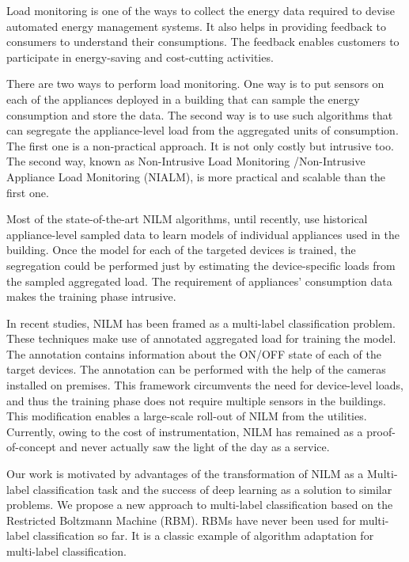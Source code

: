 \documentclass{article}
\begin{document}
Load monitoring is one of the ways to collect the energy data required to devise automated energy management systems.  It also helps in providing feedback to consumers to understand their consumptions. The feedback enables customers to participate in energy-saving and cost-cutting activities\cite{darby2006effectiveness}.

There are two ways to perform load monitoring. One way is to put sensors on each of the appliances deployed in a building that can sample the energy consumption and store the data. The second way is to use such algorithms that can segregate the appliance-level load from the aggregated units of consumption. The first one is a non-practical approach. It is not only costly but intrusive too. The second way, known as Non-Intrusive Load Monitoring /Non-Intrusive Appliance Load Monitoring (NIALM), is more practical and scalable than the first one.

Most of the state-of-the-art NILM algorithms, until recently, use historical appliance-level sampled data to learn models of individual appliances used in the building. Once the model for each of the targeted devices is trained, the segregation could be performed just by estimating the device-specific loads from the sampled aggregated load. The requirement of appliances' consumption data makes the training phase intrusive.

In recent studies, NILM has been framed as a multi-label classification problem.  These techniques make use of annotated aggregated load for training the model.  The annotation contains information about the ON/OFF state of each of the target devices. The annotation can be performed with the help of the cameras installed on premises. This framework circumvents the need for device-level loads, and thus the training phase does not require multiple sensors in the buildings. This modification enables a large-scale roll-out of NILM from the utilities. Currently, owing to the cost of instrumentation, NILM has remained as a proof-of-concept and never actually saw the light of the day as a service.

Our work is motivated by advantages of the transformation of NILM as a Multi-label classification task and the success of deep learning as a solution to similar problems. We propose a new approach to multi-label classification based on the Restricted Boltzmann Machine (RBM)\cite{Larochelle2008CUD}. RBMs have never been used for multi-label classification so far. It is a classic example of algorithm adaptation for multi-label classification.
\end{document}
